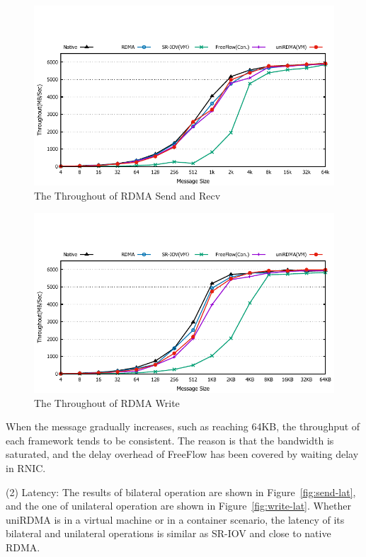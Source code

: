 \begin{figure}[!ht]
	\centering
	\includegraphics[width=1.0\linewidth]{images/send-bw.pdf}
	\caption{The Throughout of RDMA Send and Recv}
	\label{fig:send-bw}
\end{figure}

\begin{figure}[!ht]
	\centering
	\includegraphics[width=1.0\linewidth]{images/write-bw.pdf}
	\caption{The Throughout of RDMA Write}
	\label{fig:write-bw}
\end{figure}

When the message gradually increases, such as reaching 64KB, the throughput of each framework tends to be consistent. The reason is that the bandwidth is saturated, and the delay overhead of FreeFlow has been covered by waiting delay in RNIC.

(2) Latency: The results of bilateral operation are shown in Figure~\ref{fig:send-lat}, and the one of unilateral operation are shown in Figure~\ref{fig:write-lat}. Whether uniRDMA is in a virtual machine or in a container scenario, the latency of its bilateral and unilateral operations is similar as SR-IOV and close to native RDMA.

